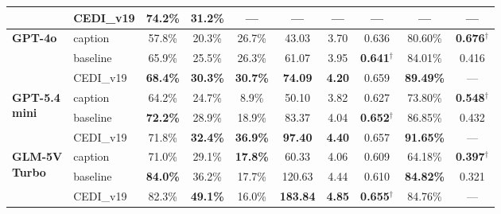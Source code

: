 \begin{table}[t]
\begin{tabular}{@{}l|l|cccccccc@{}}
\rowcolor[HTML]{E6F2FF}
  \multicolumn{1}{l}{\cellcolor[HTML]{E6F2FF}} & CEDI\_v19 & \textbf{74.2\%} & \textbf{31.2\%} & --- & --- & --- & --- & --- & --- \\
\midrule
\multirow{3}{*}{\parbox{2.5cm}{\centering\textbf{GPT-4o}\\ }}
  & caption    & 57.8\% & 20.3\% & 26.7\% & 43.03 & 3.70 & 0.636 & 80.60\% & \textbf{0.676}$^\dagger$ \\
  & baseline   & 65.9\% & 25.5\% & 26.3\% & 61.07 & 3.95 & \textbf{0.641}$^\dagger$ & 84.01\% & 0.416 \\
\rowcolor[HTML]{E6F2FF}
  \multicolumn{1}{l}{\cellcolor[HTML]{E6F2FF}} & CEDI\_v19 & \textbf{68.4\%} & \textbf{30.3\%} & \textbf{30.7\%} & \textbf{74.09} & \textbf{4.20} & 0.659 & \textbf{89.49\%} & --- \\
\midrule
\multirow{3}{*}{\parbox{2.5cm}{\centering\textbf{GPT-5.4}\\ \textbf{mini}}}
  & caption    & 64.2\% & 24.7\% & 8.9\% & 50.10 & 3.82 & 0.627 & 73.80\% & \textbf{0.548}$^\dagger$ \\
  & baseline   & \textbf{72.2\%} & 28.9\% & 18.9\% & 83.37 & 4.04 & \textbf{0.652}$^\dagger$ & 86.85\% & 0.432 \\
\rowcolor[HTML]{E6F2FF}
  \multicolumn{1}{l}{\cellcolor[HTML]{E6F2FF}} & CEDI\_v19 & 71.8\% & \textbf{32.4\%} & \textbf{36.9\%} & \textbf{97.40} & \textbf{4.40} & 0.657 & \textbf{91.65\%} & --- \\
\midrule
\multirow{3}{*}{\parbox{2.5cm}{\centering\textbf{GLM-5V}\\ \textbf{Turbo}}}
  & caption    & 71.0\% & 29.1\% & \textbf{17.8\%} & 60.33 & 4.06 & 0.609 & 64.18\% & \textbf{0.397}$^\dagger$ \\
  & baseline   & \textbf{84.0\%} & 36.2\% & 17.7\% & 120.63 & 4.44 & 0.610 & \textbf{84.82\%} & 0.321 \\
\rowcolor[HTML]{E6F2FF}
  \multicolumn{1}{l}{\cellcolor[HTML]{E6F2FF}} & CEDI\_v19 & 82.3\% & \textbf{49.1\%} & 16.0\% & \textbf{183.84} & \textbf{4.85} & \textbf{0.655}$^\dagger$ & 84.76\% & --- \\
\bottomrule
\end{tabular}
\end{table}

